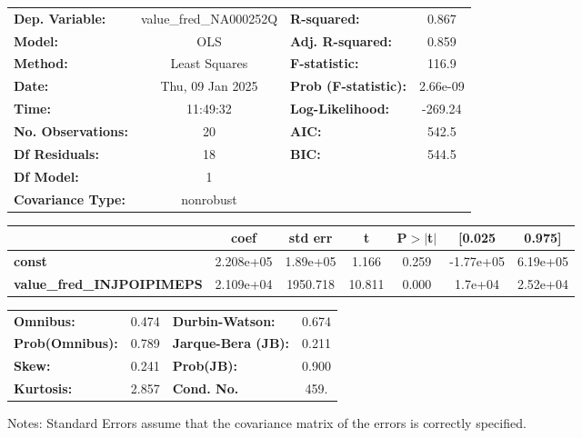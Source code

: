 \begin{center}
\begin{tabular}{lclc}
\toprule
\textbf{Dep. Variable:}            & value\_fred\_NA000252Q & \textbf{  R-squared:         } &     0.867   \\
\textbf{Model:}                    &          OLS           & \textbf{  Adj. R-squared:    } &     0.859   \\
\textbf{Method:}                   &     Least Squares      & \textbf{  F-statistic:       } &     116.9   \\
\textbf{Date:}                     &    Thu, 09 Jan 2025    & \textbf{  Prob (F-statistic):} &  2.66e-09   \\
\textbf{Time:}                     &        11:49:32        & \textbf{  Log-Likelihood:    } &   -269.24   \\
\textbf{No. Observations:}         &             20         & \textbf{  AIC:               } &     542.5   \\
\textbf{Df Residuals:}             &             18         & \textbf{  BIC:               } &     544.5   \\
\textbf{Df Model:}                 &              1         & \textbf{                     } &             \\
\textbf{Covariance Type:}          &       nonrobust        & \textbf{                     } &             \\
\bottomrule
\end{tabular}
\begin{tabular}{lcccccc}
                                   & \textbf{coef} & \textbf{std err} & \textbf{t} & \textbf{P$> |$t$|$} & \textbf{[0.025} & \textbf{0.975]}  \\
\midrule
\textbf{const}                     &    2.208e+05  &     1.89e+05     &     1.166  &         0.259        &    -1.77e+05    &     6.19e+05     \\
\textbf{value\_fred\_INJPOIPIMEPS} &    2.109e+04  &     1950.718     &    10.811  &         0.000        &      1.7e+04    &     2.52e+04     \\
\bottomrule
\end{tabular}
\begin{tabular}{lclc}
\textbf{Omnibus:}       &  0.474 & \textbf{  Durbin-Watson:     } &    0.674  \\
\textbf{Prob(Omnibus):} &  0.789 & \textbf{  Jarque-Bera (JB):  } &    0.211  \\
\textbf{Skew:}          &  0.241 & \textbf{  Prob(JB):          } &    0.900  \\
\textbf{Kurtosis:}      &  2.857 & \textbf{  Cond. No.          } &     459.  \\
\bottomrule
\end{tabular}
\end{center}

Notes: \newline
 [1] Standard Errors assume that the covariance matrix of the errors is correctly specified.